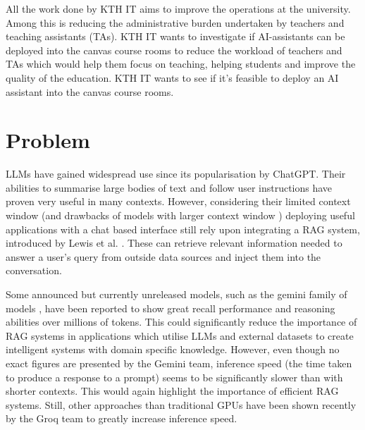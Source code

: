 All the work done by KTH IT aims to improve the operations at the university. Among this is reducing the administrative burden undertaken by teachers and teaching assistants (TAs). KTH IT wants to investigate if AI-assistants can be deployed into the canvas course rooms to reduce the workload of teachers and TAs which would help them focus on teaching, helping students and improve the quality of the education. KTH IT wants to see if it’s feasible to deploy an AI assistant into the canvas course rooms.


\section{Problem}
\label{sec:problem}




\gls{LLM}s have gained widespread use since its popularisation by ChatGPT. Their abilities to summarise large bodies of text and follow user instructions have proven very useful in many contexts. However, considering their limited context window (and drawbacks of models with larger context window \cite{liu_lost_2024}) deploying useful applications with a chat based interface still rely upon integrating a \gls{RAG} system, introduced by Lewis et al. \cite{lewis_retrieval-augmented_2020}. These can retrieve relevant information needed to answer a user's query from outside data sources and inject them into the conversation.


Some announced but currently unreleased models, such as the gemini family of models \cite{gemini_team_gemini_2024}, have been reported to show great recall performance and reasoning abilities over millions of tokens. This could significantly reduce the importance of \gls{RAG} systems in applications which utilise \gls{LLM}s and external datasets to create intelligent systems with domain specific knowledge. However, even though no exact figures are presented by the Gemini team, inference speed (the time taken to produce a response to a prompt) seems to be significantly slower than with shorter contexts. This would again highlight the importance of efficient \gls{RAG} systems. Still, other approaches than traditional GPUs have been shown recently \cite{abts_software-defined_2022} by the Groq team to greatly increase inference speed.


